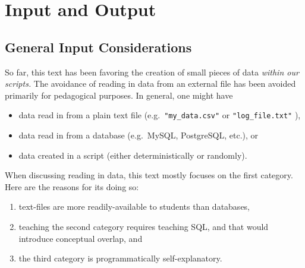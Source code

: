 \documentclass[
  12pt,
  krantz2]{krantz}
\providecommand{\tightlist}{%
  \setlength{\itemsep}{0pt}\setlength{\parskip}{0pt}}
\begin{document}
\hypertarget{input-and-output}{%
\chapter{Input and Output}\label{input-and-output}}

\hypertarget{general-input-considerations}{%
\section{General Input Considerations}\label{general-input-considerations}}

So far, this text has been favoring the creation of small pieces of data \emph{within our scripts.} The avoidance of reading in data from an external file has been avoided primarily for pedagogical purposes. In general, one might have

\begin{itemize}
\tightlist
\item
  data read in from a plain text file (e.g.~\texttt{"my\_data.csv"} or \texttt{"log\_file.txt"} ),
\item
  data read in from a database (e.g.~MySQL, PostgreSQL, etc.), or
\item
  data created in a script (either deterministically or randomly).
\end{itemize}

When discussing reading in data, this text mostly focuses on the first category. Here are the reasons for its doing so:

\begin{enumerate}
\def\labelenumi{\arabic{enumi}.}
\tightlist
\item
  text-files are more readily-available to students than databases,
\item
  teaching the second category requires teaching SQL, and that would introduce conceptual overlap, and
\item
  the third category is programmatically self-explanatory.
\end{enumerate}
\end{document}
